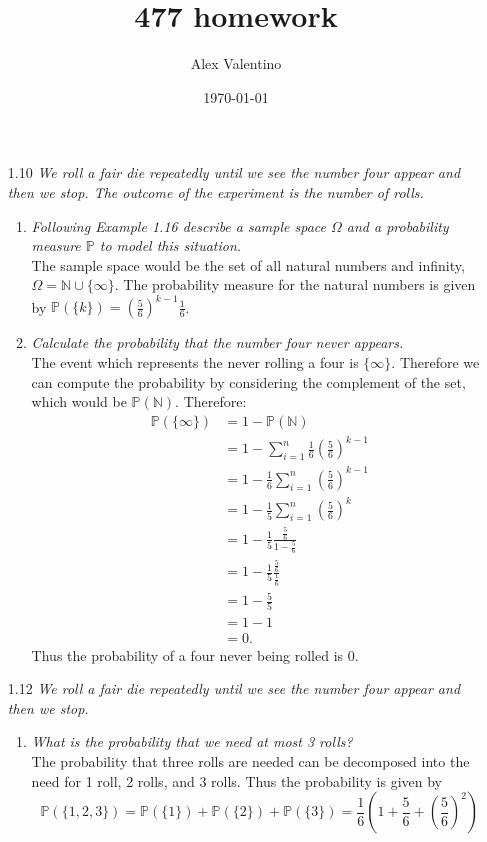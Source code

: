 \documentclass[12pt, letterpaper]{article}
\date{\today}
\author{Alex Valentino}
\title{477 homework}
\newcommand{\N}{\mathbb{N}}
\newcommand{\Pro}{\mathbb{P}}
\begin{document}
\begin{enumerate}
	\item[1.10] \textit{We roll a fair die repeatedly until we see the number four appear
and then we stop. The outcome of the experiment is the number of rolls.}
\begin{enumerate}
	\item \textit{Following Example 1.16 describe a sample space $\Omega$ and a probability
measure $\Pro$ to model this situation.}\\
	The sample space would be the set of all natural numbers and infinity, 
	$\Omega = \N \cup \{\infty\}$.  The probability measure for the natural numbers is given by $\Pro(\{k\}) = (\frac{5}{6})^{k-1}\frac{1}{6}$.
	\item \textit{Calculate the probability that the number four never appears.}\\
	The event which represents the never rolling a four is $\{\infty\}$.
	Therefore we can compute the probability by considering the complement of the set, which would be $\Pro (\N)$.  Therefore:
	\begin{align*}
		\Pro(\{\infty\}) &= 1 - \Pro(\N)\\
		&= 1 - \sum_{i=1}^n \frac{1}{6}(\frac{5}{6})^{k-1}\\
		&= 1 - \frac{1}{6} \sum_{i=1}^n (\frac{5}{6})^{k-1}\\
		&= 1 - \frac{1}{5} \sum_{i=1}^n (\frac{5}{6})^k\\
		&= 1 - \frac{1}{5} \frac{\frac{5}{6}}{1-\frac{5}{6}}\\
		&= 1 - \frac{1}{5} \frac{\frac{5}{6}}{\frac{1}{6}}\\
		&= 1 - \frac{5}{5}\\
		&= 1-1\\
		&= 0.
\end{align*}	 
	 Thus the probability of a four never being rolled is 0.
\end{enumerate}
	\item[1.12] \textit{We roll a fair die repeatedly until we see the number four appear
and then we stop.}
	\begin{enumerate}
		\item \textit{What is the probability that we need at most 3 rolls?}\\
		The probability that three rolls are needed can be decomposed into the need for 1 roll, 2 rolls, and 3 rolls.  Thus the probability is given by 
		$$
		\Pro(\{1,2,3\}) = \Pro(\{1\}) + \Pro(\{2\}) + \Pro(\{3\})
		= \frac{1}{6}(1 + \frac{5}{6} + (\frac{5}{6})^2)
$$
\end{enumerate}
\end{enumerate}
\end{document}
